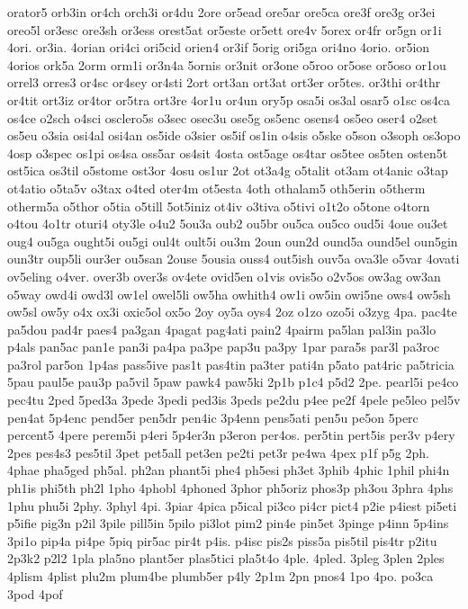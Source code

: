{orator5
orb3in
or4ch
orch3i
or4du
2ore
or5ead
ore5ar
ore5ca
ore3f
ore3g
or3ei
oreo5l
or3esc
ore3sh
or3ess
orest5at
or5este
or5ett
ore4v
5orex
or4fr
or5gn
or1i
4ori.
or3ia.
4orian
ori4ci
ori5cid
orien4
or3if
5orig
ori5ga
ori4no
4orio.
or5ion
4orios
ork5a
2orm
orm1i
or3n4a
5ornis
or3nit
or3one
o5roo
or5ose
or5oso
or1ou
orrel3
orres3
or4sc
or4sey
or4sti
2ort
ort3an
ort3at
ort3er
or5tes.
or3thi
or4thr
or4tit
ort3iz
or4tor
or5tra
ort3re
4or1u
or4un
ory5p
osa5i
os3al
osar5
o1sc
os4ca
os4ce
o2sch
o4sci
osclero5s
o3sec
osec3u
ose5g
os5enc
osens4
os5eo
oser4
o2set
os5eu
o3sia
osi4al
osi4an
os5ide
o3sier
os5if
os1in
o4sis
o5ske
o5son
o3soph
os3opo
4osp
o3spec
os1pi
os4sa
oss5ar
os4sit
4osta
ost5age
os4tar
os5tee
os5ten
osten5t
ost5ica
os3til
o5stome
ost3or
4osu
os1ur
2ot
ot3a4g
o5talit
ot3am
ot4anic
o3tap
ot4atio
o5ta5v
o3tax
o4ted
oter4m
ot5esta
4oth
othalam5
oth5erin
o5therm
otherm5a
o5thor
o5tia
o5till
5ot5iniz
ot4iv
o3tiva
o5tivi
o1t2o
o5tone
o4torn
o4tou
4o1tr
oturi4
oty3le
o4u2
5ou3a
oub2
ou5br
ou5ca
ou5co
oud5i
4oue
ou3et
oug4
ou5ga
ought5i
ou5gi
oul4t
oult5i
ou3m
2oun
oun2d
ound5a
ound5el
oun5gin
oun3tr
oup5li
our3er
ou5san
2ouse
5ousia
ouss4
out5ish
ouv5a
ova3le
o5var
4ovati
ov5eling
o4ver.
over3b
over3s
ov4ete
ovid5en
o1vis
ovis5o
o2v5os
ow3ag
ow3an
o5way
owd4i
owd3l
ow1el
owel5li
ow5ha
owhith4
ow1i
ow5in
owi5ne
ows4
ow5sh
ow5sl
ow5y
o4x
ox3i
oxic5ol
ox5o
2oy
oy5a
oys4
2oz
o1zo
ozo5i
o3zyg
4pa.
pac4te
pa5dou
pad4r
paes4
pa3gan
4pagat
pag4ati
pain2
4pairm
pa5lan
pal3in
pa3lo
p4als
pan5ac
pan1e
pan3i
pa4pa
pa3pe
pap3u
pa3py
1par
para5s
par3l
pa3roc
pa3rol
par5on
1p4as
pass5ive
pas1t
pas4tin
pa3ter
pati4n
p5ato
pat4ric
pa5tricia
5pau
paul5e
pau3p
pa5vil
5paw
pawk4
paw5ki
2p1b
p1c4
p5d2
2pe.
pearl5i
pe4co
pec4tu
2ped
5ped3a
3pede
3pedi
ped3is
3peds
pe2du
p4ee
pe2f
4pele
pe5leo
pel5v
pen4at
5p4enc
pend5er
pen5dr
pen4ic
3p4enn
pens5ati
pen5u
pe5on
5perc
percent5
4pere
perem5i
p4eri
5p4er3n
p3eron
per4os.
per5tin
pert5is
per3v
p4ery
2pes
pes4s3
pes5til
3pet
pet5all
pet3en
pe2ti
pet3r
pe4wa
4pex
p1f
p5g
2ph.
4phae
pha5ged
ph5al.
ph2an
phant5i
phe4
ph5esi
ph3et
3phib
4phic
1phil
phi4n
ph1is
phi5th
ph2l
1pho
4phobl
4phoned
3phor
ph5oriz
phos3p
ph3ou
3phra
4phs
1phu
phu5i
2phy.
3phyl
4pi.
3piar
4pica
p5ical
pi3co
pi4cr
pict4
p2ie
p4iest
pi5eti
p5ifie
pig3n
p2il
3pile
pill5in
5pilo
pi3lot
pim2
pin4e
pin5et
3pinge
p4inn
5p4ins
3pi1o
pip4a
pi4pe
5piq
pir5ac
pir4t
p4is.
p4isc
pis2s
piss5a
pis5til
pis4tr
p2itu
2p3k2
p2l2
1pla
pla5no
plant5er
plas5tici
pla5t4o
4ple.
4pled.
3pleg
3plen
2ples
4plism
4plist
plu2m
plum4be
plumb5er
p4ly
2p1m
2pn
pnos4
1po
4po.
po3ca
3pod
4pof
}
